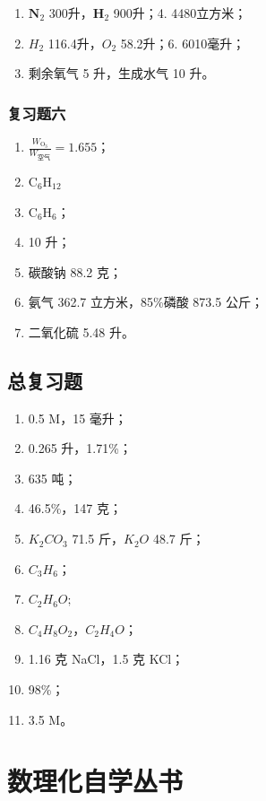 \begin{enumerate}[start=3]
\item
  \(\mathbf{N}_2\) 300升，\(\mathbf{H}_2\) 900升；4. 4480立方米；
\item
  \(H_{2}\) 116.4升，\(O_{2}\) 58.2升；6. 6010毫升；
\item
  剩余氧气 5 升，生成水气 10 升。
\end{enumerate}

\subsection{复习题六}

\begin{enumerate}[start=2]
\item
  \(\frac{W_{\mathrm{O}_3}}{W_{\text{空气}}} = 1.655\)；
\item
  \(\mathrm{C_6H_{12}}\)
\item
  \(\mathrm{C_6H_6}\)；
\item
  10 升；
\item
  碳酸钠 88.2 克；
\item
  氨气 362.7 立方米，85\%磷酸 873.5 公斤；
\item
  二氧化硫 5.48 升。
\end{enumerate}

\section{总复习题}

\begin{enumerate}[start=20]
\item
  0.5 M，15 毫升；
\item
  0.265 升，1.71\%；
\item
  635 吨；
\item
  46.5\%，147 克；
\item
  \(K_{2}CO_{3}\) 71.5 斤，\(K_{2}O\) 48.7 斤；
\item
  \(C_{3}H_{6}\)；
\item
  \(C_{2}H_{6}O;\)
\item
  \(C_{4}H_{8}O_{2}\)，\(C_{2}H_{4}O\)；
\item
  1.16 克 NaCl，1.5 克 KCl；
\item
  98\%；
\item
  3.5 M。
\end{enumerate}

\chapter{数理化自学丛书}

